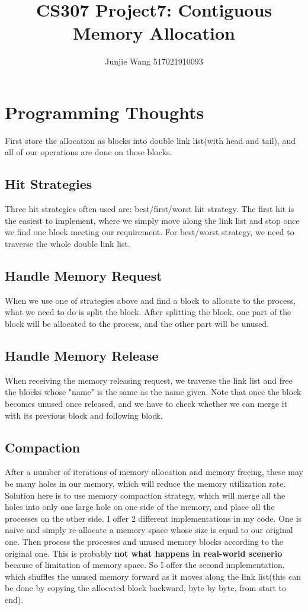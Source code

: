 \documentclass[12pt]{extarticle}
\title{CS307 Project7: Contiguous Memory Allocation}
\author{Junjie Wang 517021910093}
\newcommand{\<}{\langle}
\renewcommand{\>}{\rangle}
\theoremstyle{definition}
\begin{document}
	\maketitle
	\section{Programming Thoughts}
	First store the allocation as blocks into double link list(with head and tail), and all of our operations are done on these blocks. \\
	\subsection{Hit Strategies} Three hit strategies often used are: best/first/worst hit strategy. The first hit is the easiest to implement, where we simply move along the link list and stop once we find one block meeting our requirement. For best/worst strategy, we need to traverse the whole double link list. \\
	\subsection{Handle Memory Request} When we use one of strategies above and find a block to allocate to the process, what we need to do is split the block. After splitting the block, one part of the block will be allocated to the process, and the other part will be unused. \\
	\subsection{Handle Memory Release} When receiving the memory releasing request, we traverse the link list and free the blocks whose "name" is the same as the name given. Note that once the block becomes unused once released, and we have to check whether we can merge it with its previous block and following block. \\
	\subsection{Compaction} After a number of iterations of memory allocation and memory freeing, these may be many holes in our memory, which will reduce the memory utilization rate. Solution here is to use memory compaction strategy, which will merge all the holes into only one large hole on one side of the memory, and place all the processes on the other side. I offer 2 different implementations in my code. One is naive and simply re-allocate a memory space whose size is equal to our original one. Then process the processes and unused memory blocks according to the original one. This is probably \textbf{not what happens in real-world scenerio} because of limitation of memory space. So I offer the second implementation, which shuffles the unused memory forward as it moves along the link list(this can be done by copying the allocated block backward, byte by byte, from start to end). 
\end{document}
